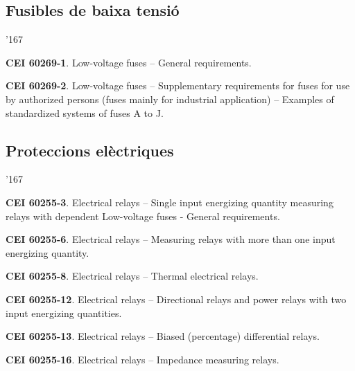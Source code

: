 \subsection*{Fusibles de baixa tensi\'{o}}
\begin{dinglist}{'167}
    \item \textbf{CEI 60269-1}. Low-voltage fuses -- General requirements.
    \item \textbf{CEI 60269-2}. Low-voltage fuses -- Supplementary requirements for fuses for use by authorized persons
          (fuses mainly for industrial application) -- Examples of standardized systems of fuses A to J.
\end{dinglist}

\subsection*{Proteccions el\`{e}ctriques}
\begin{dinglist}{'167}
    \item \textbf{CEI 60255-3}. Electrical relays -- Single input energizing quantity measuring relays with dependent Low-voltage fuses - General requirements.
    \item \textbf{CEI 60255-6}. Electrical relays -- Measuring relays with more than one input energizing quantity.
    \item \textbf{CEI 60255-8}. Electrical relays -- Thermal electrical relays.
    \item \textbf{CEI 60255-12}. Electrical relays -- Directional relays and power relays with two input energizing quantities.
    \item \textbf{CEI 60255-13}. Electrical relays -- Biased (percentage) differential relays.
    \item \textbf{CEI 60255-16}. Electrical relays -- Impedance measuring relays.
\end{dinglist}

